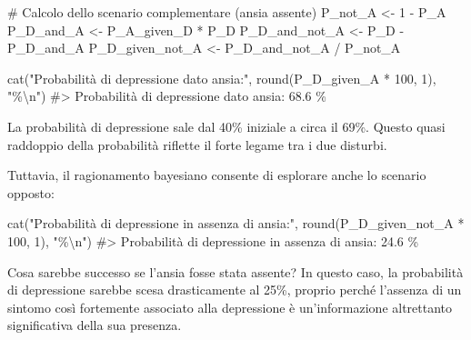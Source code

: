 \documentclass[
  letterpaper,
  DIV=11,
  numbers=noendperiod,
  oneside]{scrreprt}
\newenvironment{Shaded}{\begin{snugshade}}{\end{snugshade}}
\newcommand{\CommentTok}[1]{\textcolor[rgb]{0.37,0.37,0.37}{#1}}
\newcommand{\DecValTok}[1]{\textcolor[rgb]{0.68,0.00,0.00}{#1}}
\newcommand{\FunctionTok}[1]{\textcolor[rgb]{0.28,0.35,0.67}{#1}}
\newcommand{\NormalTok}[1]{\textcolor[rgb]{0.00,0.23,0.31}{#1}}
\newcommand{\OtherTok}[1]{\textcolor[rgb]{0.00,0.23,0.31}{#1}}
\newcommand{\SpecialCharTok}[1]{\textcolor[rgb]{0.37,0.37,0.37}{#1}}
\newcommand{\StringTok}[1]{\textcolor[rgb]{0.13,0.47,0.30}{#1}}
\theoremstyle{definition}
\theoremstyle{plain}
\theoremstyle{definition}
\theoremstyle{remark}
\begin{document}
\begin{tcolorbox}
\begin{Shaded}
\begin{Highlighting}[]
\CommentTok{\# Calcolo dello scenario complementare (ansia assente)}
\NormalTok{P\_not\_A }\OtherTok{\textless{}{-}} \DecValTok{1} \SpecialCharTok{{-}}\NormalTok{ P\_A}
\NormalTok{P\_D\_and\_A }\OtherTok{\textless{}{-}}\NormalTok{ P\_A\_given\_D }\SpecialCharTok{*}\NormalTok{ P\_D}
\NormalTok{P\_D\_and\_not\_A }\OtherTok{\textless{}{-}}\NormalTok{ P\_D }\SpecialCharTok{{-}}\NormalTok{ P\_D\_and\_A}
\NormalTok{P\_D\_given\_not\_A }\OtherTok{\textless{}{-}}\NormalTok{ P\_D\_and\_not\_A }\SpecialCharTok{/}\NormalTok{ P\_not\_A}

\FunctionTok{cat}\NormalTok{(}\StringTok{"Probabilità di depressione dato ansia:"}\NormalTok{, }\FunctionTok{round}\NormalTok{(P\_D\_given\_A }\SpecialCharTok{*} \DecValTok{100}\NormalTok{, }\DecValTok{1}\NormalTok{), }\StringTok{"\%}\SpecialCharTok{\textbackslash{}n}\StringTok{"}\NormalTok{)}
\CommentTok{\#\textgreater{} Probabilità di depressione dato ansia: 68.6 \%}
\end{Highlighting}
\end{Shaded}

La probabilità di depressione sale dal 40\% iniziale a circa il 69\%.
Questo quasi raddoppio della probabilità riflette il forte legame tra i
due disturbi.

Tuttavia, il ragionamento bayesiano consente di esplorare anche lo
scenario opposto:

\begin{Shaded}
\begin{Highlighting}[]
\FunctionTok{cat}\NormalTok{(}\StringTok{"Probabilità di depressione in assenza di ansia:"}\NormalTok{, }\FunctionTok{round}\NormalTok{(P\_D\_given\_not\_A }\SpecialCharTok{*} \DecValTok{100}\NormalTok{, }\DecValTok{1}\NormalTok{), }\StringTok{"\%}\SpecialCharTok{\textbackslash{}n}\StringTok{"}\NormalTok{)}
\CommentTok{\#\textgreater{} Probabilità di depressione in assenza di ansia: 24.6 \%}
\end{Highlighting}
\end{Shaded}

Cosa sarebbe successo se l'ansia fosse stata assente? In questo caso, la
probabilità di depressione sarebbe scesa drasticamente al 25\%, proprio
perché l'assenza di un sintomo così fortemente associato alla
depressione è un'informazione altrettanto significativa della sua
presenza.


\end{tcolorbox}
\end{document}
